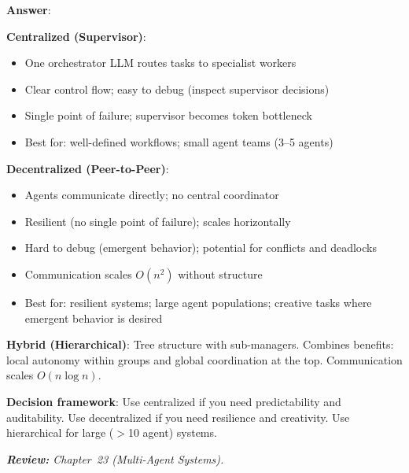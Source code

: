 \begin{questionbox}
\textbf{Answer}:

\textbf{Centralized (Supervisor)}:

\begin{itemize}
  \item One orchestrator LLM routes tasks to specialist workers
  \item Clear control flow; easy to debug (inspect supervisor decisions)
  \item Single point of failure; supervisor becomes token bottleneck
  \item Best for: well-defined workflows; small agent teams (3--5 agents)
\end{itemize}

\textbf{Decentralized (Peer-to-Peer)}:

\begin{itemize}
  \item Agents communicate directly; no central coordinator
  \item Resilient (no single point of failure); scales horizontally
  \item Hard to debug (emergent behavior); potential for conflicts and deadlocks
  \item Communication scales $O(n^2)$ without structure
  \item Best for: resilient systems; large agent populations; creative tasks where emergent behavior is desired
\end{itemize}

\textbf{Hybrid (Hierarchical)}: Tree structure with sub-managers. Combines benefits: local autonomy within groups and global coordination at the top. Communication scales $O(n \log n)$.

\textbf{Decision framework}: Use centralized if you need predictability and auditability. Use decentralized if you need resilience and creativity. Use hierarchical for large ($>$10 agent) systems.

\emph{\textbf{Review:} Chapter~23 (Multi-Agent Systems).}
\end{questionbox}

